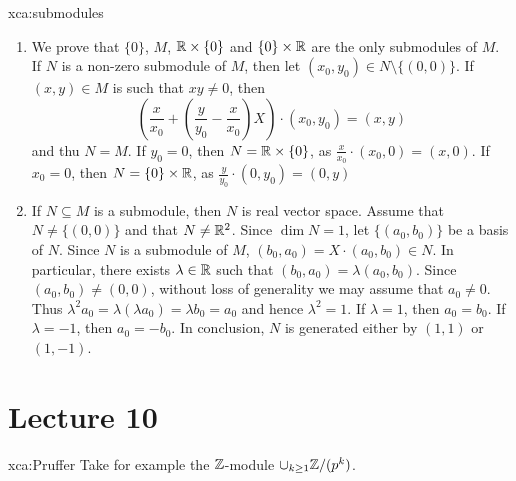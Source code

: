 \begin{sol}{xca:submodules}
    \begin{enumerate}
        \item We prove that $\{0\}$, $M$, $\mathbb{R}\times\{0\}$ and $\{0\}\times\mathbb{R}$ are
        the only submodules of $M$. If $N$ is a non-zero submodule of $M$, then
        let $(x_0,y_0)\in N\setminus\{(0,0)\}$. If $(x,y)\in M$ is such that $xy\ne 0$, then
        \[
            \left(\frac{x}{x_0}+\left(\frac{y}{y_0}-\frac{x}{x_0}\right)X\right)\cdot (x_0,y_0)=(x,y) 
        \]
        and thu $N=M$. If $y_0=0$, then $N=\mathbb{R}\times\{0\}$, as $\frac{x}{x_0}\cdot (x_0,0)=(x,0)$. If $x_0=0$, then
        $N=\{0\}\times\mathbb{R}$, as 
        $\frac{y}{y_0}\cdot (0,y_0)=(0,y)$ 
            \item If $N\subseteq M$ is a submodule, then $N$ is real vector space. Assume that 
            $N\ne\{(0,0)\}$ and that $N\ne\mathbb{R}^2$. Since $\dim N=1$, 
            let $\{(a_0,b_0)\}$ be a basis of $N$. Since $N$ is a submodule of $M$, 
            $(b_0,a_0)=X\cdot (a_0,b_0)\in N$. In particular, there exists 
            $\lambda\in\mathbb{R}$ such that $(b_0,a_0)=\lambda (a_0,b_0)$. Since $(a_0,b_0)\ne(0,0)$, 
            without loss of generality we may assume that 
            $a_0\ne 0$. Thus 
            $\lambda^2 a_0=\lambda (\lambda a_0)=\lambda b_0=a_0$ and hence
            $\lambda^2=1$. If $\lambda=1$, then 
            $a_0=b_0$. If $\lambda=-1$, then $a_0=-b_0$. In conclusion, $N$ 
            is generated either by $(1,1)$ or $(1,-1)$.  
    \end{enumerate}
\end{sol}

\section*{Lecture 10}

\begin{sol}{xca:Pruffer}
	Take for example the $\mathbb{Z}$-module $\cup_{k\geq1}\mathbb{Z}/(p^k)$.
\end{sol}


